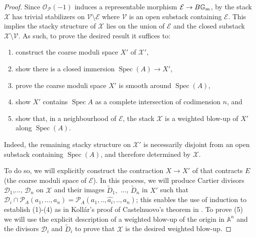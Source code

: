 \documentclass{amsart}
\newcommand{\bA}{\mathbb{A}}
\newcommand{\bG}{\mathbb{G}}
\newcommand{\cD}{\mathcal{D}}
\newcommand{\cE}{\mathcal{E}}
\newcommand{\cO}{\mathcal{O}}
\newcommand{\cP}{\mathcal{P}}
\newcommand{\cV}{\mathcal{V}}
\newcommand{\cX}{\mathcal{X}}
\newcommand{\spec}{\operatorname{Spec}}
\newcommand{\Gm}{\bG_{{\rm m}}}
\theoremstyle{definition}
\begin{document}
\begin{proof}
Since $\cO_{\cP}(-1)$ induces a representable morphism $\cE\to B\Gm$, by  the stack $\cX$ has trivial stabilizers on $\cV \setminus \cE$ where $\cV$ is an open substack containing $\cE$. This implies the stacky structure of $\cX$ lies on the union of $\cE$ and the closed substack $\cX \setminus \cV$. As such, to prove the desired result it suffices to:

\begin{enumerate}
\item construct the coarse moduli space $X'$ of $\cX'$,
\item show there is a closed immersion $\spec(A) \to X'$,
    \item prove the coarse moduli space $X'$ is smooth around $\spec(A)$,
    \item show $X'$ contains $\spec A$ as a complete intersection of codimension $n$, and
    \item show that, in a neighbourhood of $\cE$, the stack $\cX$ is a weighted blow-up of $X'$ along $\spec(A)$.
\end{enumerate} 

\noindent Indeed, the remaining stacky structure on $\cX'$ is necessarily disjoint from an open substack containing $\spec(A)$, and therefore determined by $\cX$.

To do so, we will explicitly construct the contraction $X\to X'$ of  that contracts $E$ (the coarse moduli space of $\cE$). In this process, we will produce Cartier divisors $\cD_1$,..., $\cD_n$ on $\cX$ and their images $\widetilde{D}_1,$ ..., $\widetilde{D}_n$ in $X'$ such that $\cD_i \cap \cP_A(a_1,...,a_n)=\cP_A(a_1,..,\widehat{a_i},..,a_n)$; this enables the use of induction to establish (1)-(4) as in Koll\'ar's proof of Castelnuovo's theorem in \cite{kol_resol}.
To prove (5) we will use the explicit description of a weighted blow-up of the origin in $\bA^{n}$ and the divisors $\cD_i$ and $\widetilde{D}_i$ to prove that $\cX$ is the desired weighted blow-up.


\end{proof}
\end{document}
